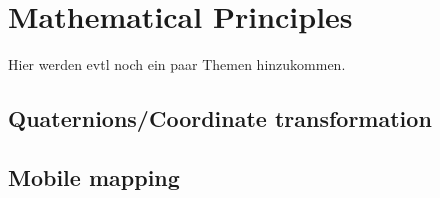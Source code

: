 \chapter{Mathematical Principles}
Hier werden evtl noch ein paar Themen hinzukommen.
\section{Quaternions/Coordinate transformation}
\section{Mobile mapping}

